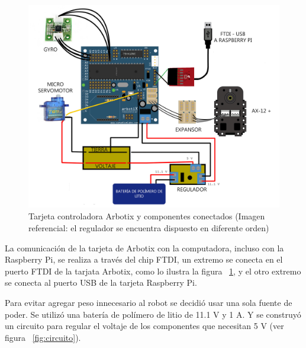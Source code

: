 \begin{figure}[hbtp]
\centering
\includegraphics[scale=0.2]{imagenes/arbotix_componentes1.jpg}
\caption{Tarjeta controladora Arbotix y componentes conectados (Imagen referencial: el regulador se encuentra dispuesto en diferente orden)}
\label{fig:arbotixConectados}
\end{figure}

La comunicación de la tarjeta de Arbotix con la computadora, incluso con la Raspberry Pi, se realiza a través del chip FTDI, un extremo se conecta en el puerto FTDI de la tarjata Arbotix, como lo ilustra la figura ~\ref{fig:arbotixConectados}, y el otro extremo se conecta al puerto \gls{USB} de la tarjeta Raspberry Pi.

Para evitar agregar peso innecesario al robot se decidi\'o usar una sola fuente de poder. Se utilizó una batería de polímero de litio de 11.1 V y 1 A. Y se construyó un circuito para regular el voltaje de los componentes que necesitan 5 V (ver figura ~\ref{fig:circuito}).



